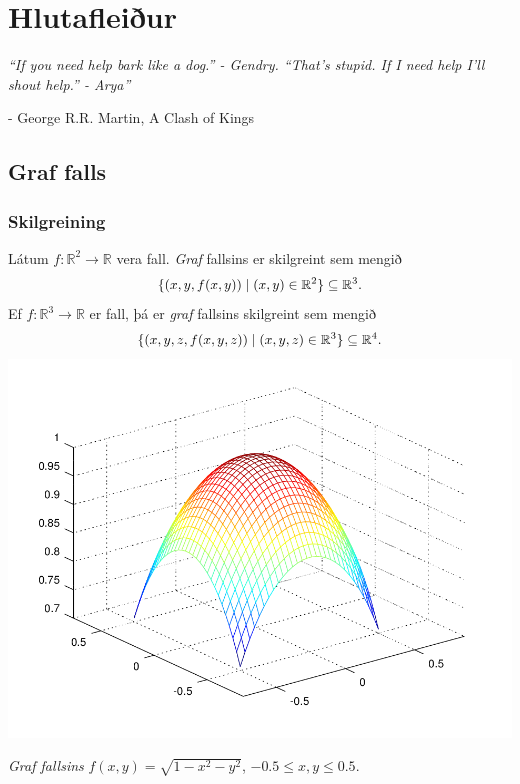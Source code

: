 \documentclass[a4paper,10pt,icelandic]{sphinxmanual}
\begin{document}
\chapter{Hlutafleiður}
\label{Kafli2::doc}\label{Kafli2:hlutafleiur}
\emph{“If you need help bark like a dog.'' - Gendry. ``That's stupid. If I need help I'll shout help.'' - Arya”}

- George R.R. Martin, A Clash of Kings


\section{Graf falls}
\label{Kafli2:graf-falls}

\subsection{Skilgreining}
\label{Kafli2:skilgreining}\label{Kafli2:index-0}
Látum \(f:{\mathbb  R}^2\rightarrow {\mathbb  R}\) vera fall. \emph{Graf}
fallsins er skilgreint sem mengið
\begin{gather}
\begin{split}\displaystyle \{(x,y,f(x,y))\mid (x,y)\in{\mathbb  R}^2\}\subseteq {\mathbb  R}^3.\end{split}\notag
\end{gather}
Ef \(f:{\mathbb  R}^3\rightarrow {\mathbb  R}\) er fall, þá er
\emph{graf} fallsins skilgreint sem mengið
\begin{gather}
\begin{split}\displaystyle \{(x,y,z,f(x,y,z))\mid (x,y,z)\in{\mathbb  R}^3\}\subseteq {\mathbb  R}^4.\end{split}\notag
\end{gather}
{\hfill\includegraphics[width=0.600\linewidth]{surface.png}\hfill}

\emph{Graf fallsins} \(f(x,y) = \sqrt{1-x^2-y^2}\), \(-0.5\leq x,y\leq 0.5\).
\end{document}
